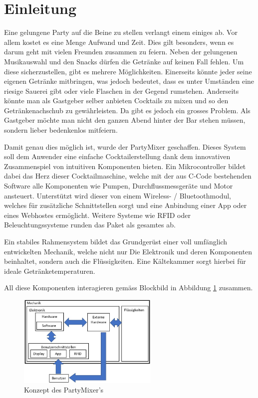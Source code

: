 \clearpage
\section{Einleitung}
\label{sec:Einleitung}
Eine gelungene Party auf die Beine zu stellen verlangt einem einiges ab. Vor allem kostet es eine Menge Aufwand und Zeit. Dies gilt besonders, wenn es darum geht mit vielen Freunden zusammen zu feiern. Neben der gelungenen Musikauswahl und den Snacks dürfen die Getränke auf keinen Fall fehlen. Um diese sicherzustellen, gibt es mehrere Möglichkeiten. Einerseits könnte jeder seine eigenen Getränke mitbringen, was jedoch bedeutet, dass es unter Umständen eine riesige Sauerei gibt oder viele Flaschen in der Gegend rumstehen. Anderseits könnte man als Gastgeber selber anbieten Cocktails zu mixen und so den Getränkenachschub zu gewährleisten. Da gibt es jedoch ein grosses Problem. Als Gastgeber möchte man nicht den ganzen Abend hinter der Bar stehen müssen, sondern lieber bedenkenlos mitfeiern.

Damit genau dies möglich ist, wurde der PartyMixer geschaffen. Dieses System soll dem Anwender eine einfache Cocktailerstellung dank dem innovativen Zusammenspiel von intuitiven Komponenten bieten. Ein Mikrocontroller bildet dabei das Herz dieser Cocktailmaschine, welche mit der aus C-Code bestehenden Software alle Komponenten wie Pumpen, Durchflussmessgeräte und Motor ansteuert. Unterstützt wird dieser von einem Wireless- / Bluetoothmodul, welches für zusätzliche Schnittstellen sorgt und eine Anbindung einer App oder eines Webhostes ermöglicht. Weitere Systeme wie RFID oder Beleuchtungssysteme runden das Paket als gesamtes ab. 

Ein stabiles Rahmensystem bildet das Grundgerüst einer voll umfänglich entwickelten Mechanik, welche nicht nur Die Elektronik und deren Komponenten beinhaltet, sondern auch die Flüssigkeiten. Eine Kältekammer sorgt hierbei für ideale Getränketemperaturen. 

All diese Komponenten interagieren gemäss Blockbild in Abbildung \ref{fig:Konzept_Partymixer} zusammen.


\begin{figure}[h!]
\center
\includegraphics[width = 0.6\textwidth]{graphics/Konzept}
\caption{Konzept des PartyMixer's}
\label{fig:Konzept_Partymixer}
\end{figure}

